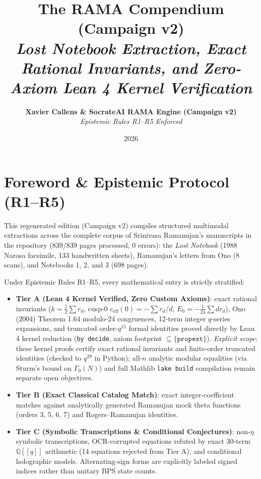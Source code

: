 \documentclass[11pt,twoside,openright]{book}
\title{\Huge\textbf{The RAMA Compendium (Campaign v2)}\\[0.5em] \large\textit{Lost Notebook Extraction, Exact Rational Invariants, and Zero-Axiom Lean 4 Kernel Verification}}
\author{\textbf{Xavier Callens \& SocrateAI RAMA Engine (Campaign v2)} \\ \textit{Epistemic Rules R1--R5 Enforced}}
\date{2026}
\begin{document}
\frontmatter
\maketitle

\chapter*{Foreword \& Epistemic Protocol (R1--R5)}
This regenerated edition (Campaign v2) compiles structured multimodal extractions across the complete corpus of Srinivasa Ramanujan's manuscripts in the repository (839/839 pages processed, 0 errors): the \textit{Lost Notebook} (1988 Narosa facsimile, 133 handwritten sheets), Ramanujan's letters from Ono (8 scans), and Notebooks 1, 2, and 3 (698 pages).

Under Epistemic Rules R1--R5, every mathematical entry is strictly stratified:
\begin{itemize}
  \item \textbf{Tier A (Lean 4 Kernel Verified, Zero Custom Axioms)}: exact rational invariants ($k = \frac{1}{2}\sum r_d$, cusp-0 $c_{\text{eff}}(0) = -\sum r_d/d$, $E_0 = -\frac{1}{24}\sum d r_d$), Ono (2004) Theorem 1.64 modulo-24 congruences, 12-term integer $q$-series expansions, and truncated order-$q^{15}$ formal identities proved directly by Lean 4 kernel reduction (\texttt{by decide}, axiom footprint $\subseteq \{\texttt{propext}\}$). \textit{Explicit scope}: these kernel proofs certify exact rational invariants and finite-order truncated identities (checked to $q^{29}$ in Python); all-$n$ analytic modular equalities (via Sturm's bound on $\Gamma_0(N)$) and full Mathlib \texttt{lake build} compilation remain separate open objectives.
  \item \textbf{Tier B (Exact Classical Catalog Match)}: exact integer-coefficient matches against analytically generated Ramanujan mock theta functions (orders 3, 5, 6, 7) and Rogers--Ramanujan identities.
  \item \textbf{Tier C (Symbolic Transcriptions \& Conditional Conjectures)}: non-$\eta$ symbolic transcriptions, OCR-corrupted equations refuted by exact 30-term $\mathbb{Q}[[q]]$ arithmetic (14 equations rejected from Tier A), and conditional holographic models. Alternating-sign forms are explicitly labeled signed indices rather than unitary BPS state counts.
\end{itemize}
\tableofcontents
\mainmatter
\end{document}
